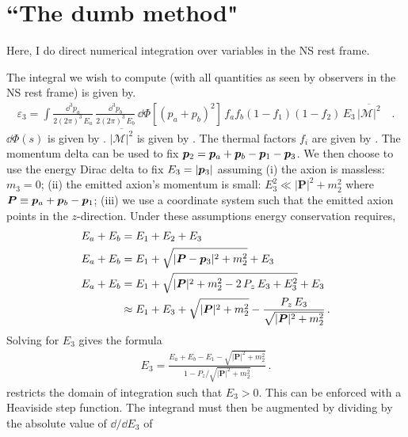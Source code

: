 \section{``The dumb method"}
Here, I do direct numerical integration over variables in the NS rest frame.

The integral we wish to compute (with all quantities as seen by observers in the NS rest frame) is given by.
\begin{align}
    \varepsilon_3 = 
       \int \frac{\dd^3 p_a}{2(2\pi)^3\, E_a} 
    \, \frac{\dd^3 p_b}{2(2\pi)^3\, E_b} 
    \, \dd \Phi[(p_a + p_b)^2]
    \, f_a f_b (1 - f_1) (1 - f_2)
    \, E_3
    \, \overline{|\mathcal{M}|^2} \quad .
\end{align}
$\dd \Phi(s)$ is given by . $\overline{|\mathcal{M}|^2}$ is given by . The thermal factors $f_i$ are given by . The momentum delta can be used to fix $\pvec[2] = \pvec[a] + \pvec[b] - \pvec[1] - \pvec[3]$. 
We then choose to use the energy Dirac delta to fix $E_3 = |\pvec[3]|$ assuming (i) the axion is massless: $m_3 = 0$; (ii) the emitted axion's momentum is small: $E_3^2 \ll |\bm{P}|^2 + m_2^2$ where $\bm{P} \equiv \pvec[a] + \pvec[b] - \pvec[1]$; (iii) we use a coordinate system such that the emitted axion points in the $z$-direction. 
Under these assumptions energy conservation requires,
\begin{align}
    E_a + E_b &= E_1 + E_2 + E_3 \\
    E_a + E_b &= E_1 + \sqrt{|\bm{P} - \pvec[3]|^2 + m_2^2} + E_3 \\
    \label{eq:dumb-method-energy-conservation}
    E_a + E_b &= E_1 +
        \sqrt{|\bm{P}|^2 + m_2^2 -
            2 \, P_z \, E_3 + E_3^2
            }  +
        E_3 \\
    &\approx
        E_1 + E_3 + \sqrt{|\bm{P}|^2 + m_2^2} -
        \frac{P_z \, E_3}{\sqrt{|\bm{P}|^2 + m_2^2}} \, .
\end{align}
Solving for $E_3$ gives the formula
\begin{align}
    \label{eq:pmag3-formula}
    E_3 = \frac{E_a + E_b - E_1 - \sqrt{|\bm{P}|^2 + m_2^2}}{1 - P_z / \sqrt{|\bm{P}|^2 + m_2^2}} \, .
\end{align}
 restricts the domain of integration such that $E_3 > 0$. 
This can be enforced with a Heaviside step function. 
The integrand must then be augmented by dividing by the absolute value of $\dd / \dd E_3$ of 
